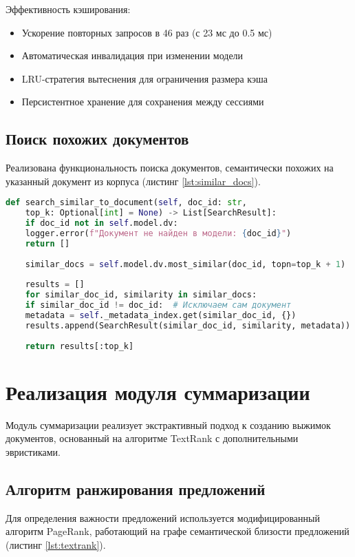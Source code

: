 Эффективность кэширования:
\begin{itemize}
	\item Ускорение повторных запросов в 46 раз (с 23 мс до 0.5 мс)
	\item Автоматическая инвалидация при изменении модели
	\item LRU-стратегия вытеснения для ограничения размера кэша
	\item Персистентное хранение для сохранения между сессиями
\end{itemize}

\subsection{Поиск похожих документов}

Реализована функциональность поиска документов, семантически похожих на указанный документ из корпуса (листинг \ref{lst:similar_docs}).

\begin{lstlisting}[language=Python,caption={Поиск похожих документов},label=lst:similar_docs]
	def search_similar_to_document(self, doc_id: str, 
	top_k: Optional[int] = None) -> List[SearchResult]:
	if doc_id not in self.model.dv:
	logger.error(f"Документ не найден в модели: {doc_id}")
	return []
	
	similar_docs = self.model.dv.most_similar(doc_id, topn=top_k + 1)
	
	results = []
	for similar_doc_id, similarity in similar_docs:
	if similar_doc_id != doc_id:  # Исключаем сам документ
	metadata = self._metadata_index.get(similar_doc_id, {})
	results.append(SearchResult(similar_doc_id, similarity, metadata))
	
	return results[:top_k]
\end{lstlisting}

\section{Реализация модуля суммаризации}

Модуль суммаризации реализует экстрактивный подход к созданию выжимок документов, основанный на алгоритме TextRank с дополнительными эвристиками.

\subsection{Алгоритм ранжирования предложений}

Для определения важности предложений используется модифицированный алгоритм PageRank, работающий на графе семантической близости предложений (листинг \ref{lst:textrank}).

